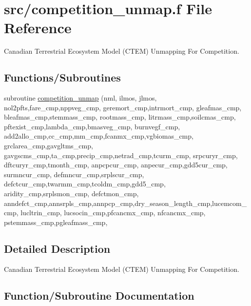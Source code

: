 \hypertarget{competition__unmap_8f}{}\section{src/competition\+\_\+unmap.f File Reference}
\label{competition__unmap_8f}


Canadian Terrestrial Ecosystem Model (C\+T\+E\+M) Unmapping For Competition.  


\subsection*{Functions/\+Subroutines}
\begin{DoxyCompactItemize}
\item 
subroutine \hyperlink{competition__unmap_8f_ab970a794d878e125da563f7022d2d3a4}{competition\+\_\+unmap} (nml, ilmos, jlmos, nol2pfts,fare\+\_\+cmp,nppveg\+\_\+cmp, geremort\+\_\+cmp,intrmort\+\_\+cmp, gleafmas\+\_\+cmp, bleafmas\+\_\+cmp,stemmass\+\_\+cmp, rootmass\+\_\+cmp, litrmass\+\_\+cmp,soilcmas\+\_\+cmp, pftexist\+\_\+cmp,lambda\+\_\+cmp,bmasveg\+\_\+cmp, burnvegf\+\_\+cmp, add2allo\+\_\+cmp,cc\+\_\+cmp,mm\+\_\+cmp,fcanmx\+\_\+cmp,vgbiomas\+\_\+cmp, grclarea\+\_\+cmp,gavgltms\+\_\+cmp, gavgscms\+\_\+cmp,ta\+\_\+cmp,precip\+\_\+cmp,netrad\+\_\+cmp,tcurm\+\_\+cmp, srpcuryr\+\_\+cmp, dftcuryr\+\_\+cmp,tmonth\+\_\+cmp, anpcpcur\+\_\+cmp, anpecur\+\_\+cmp,gdd5cur\+\_\+cmp, surmncur\+\_\+cmp, defmncur\+\_\+cmp,srplscur\+\_\+cmp, defctcur\+\_\+cmp,twarmm\+\_\+cmp,tcoldm\+\_\+cmp,gdd5\+\_\+cmp, aridity\+\_\+cmp,srplsmon\+\_\+cmp, defctmon\+\_\+cmp, anndefct\+\_\+cmp,annsrpls\+\_\+cmp,annpcp\+\_\+cmp,dry\+\_\+season\+\_\+length\+\_\+cmp,lucemcom\+\_\+cmp, lucltrin\+\_\+cmp, lucsocin\+\_\+cmp,pfcancmx\+\_\+cmp, nfcancmx\+\_\+cmp, pstemmass\+\_\+cmp,pgleafmass\+\_\+cmp,
\end{DoxyCompactItemize}


\subsection{Detailed Description}
Canadian Terrestrial Ecosystem Model (C\+T\+E\+M) Unmapping For Competition. 



\subsection{Function/\+Subroutine Documentation}
\hypertarget{competition__unmap_8f_ab970a794d878e125da563f7022d2d3a4}{}
